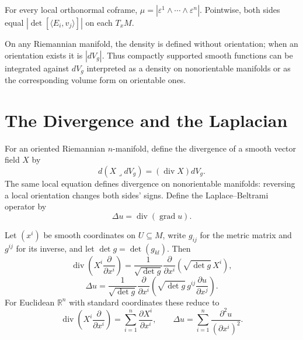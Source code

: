 \begin{proposition}\label{prop:riemannian-density-formula}


For every local orthonormal coframe,
$\mu=|\varepsilon^1\wedge\cdots\wedge\varepsilon^n|$. Pointwise, both sides
equal $|\det[\langle E_i,v_j\rangle]|$ on each $T_xM$.
\end{proposition}

On any Riemannian manifold, the density is defined without orientation; when an orientation exists it is $|dV_g|$. Thus compactly supported smooth functions can be integrated against $dV_g$ interpreted as a density on nonorientable manifolds or as the corresponding volume form on orientable ones.

\section{The Divergence and the Laplacian}

For an oriented Riemannian $n$-manifold, define the divergence of a smooth vector field $X$ by
\begin{equation}
d(X\lrcorner dV_g)=(\operatorname{div}X)dV_g. \tag{2.19}
\end{equation}
The same local equation defines divergence on nonorientable manifolds: reversing a local orientation changes both sides' signs. Define the Laplace--Beltrami operator by
\begin{equation}
\Delta u=\operatorname{div}(\operatorname{grad}u). \tag{2.20}
\end{equation}

\begin{proposition}
\label{prop:coordinate-representations-divergence-laplacian}
Let $(x^i)$ be smooth coordinates on $U\subseteq M$, write $g_{ij}$ for the metric matrix and $g^{ij}$ for its inverse, and let $\det g=\det(g_{kl})$. Then
\[
\operatorname{div}\left(X^i\frac{\partial}{\partial x^i}\right)=\frac{1}{\sqrt{\det g}}\frac{\partial}{\partial x^i}\left(\sqrt{\det g}\,X^i\right),
\]
\[
\Delta u=\frac{1}{\sqrt{\det g}}\frac{\partial}{\partial x^i}\left(\sqrt{\det g}\,g^{ij}\frac{\partial u}{\partial x^j}\right).
\]
For Euclidean $\mathbb R^n$ with standard coordinates these reduce to
\[
\operatorname{div}\left(X^i\frac{\partial}{\partial x^i}\right)=\sum_{i=1}^n\frac{\partial X^i}{\partial x^i},
\qquad
\Delta u=\sum_{i=1}^n\frac{\partial^2u}{(\partial x^i)^2}.
\]
\end{proposition}

